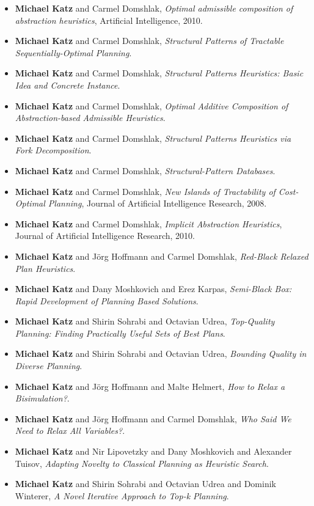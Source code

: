 \begin{itemize}[noitemsep]
\item {\bf Michael Katz} and Carmel Domshlak, {\it Optimal admissible composition of abstraction heuristics}, Artificial Intelligence, 2010.
\item {\bf Michael Katz} and Carmel Domshlak, {\it Structural Patterns of Tractable Sequentially-Optimal Planning}.
\item {\bf Michael Katz} and Carmel Domshlak, {\it Structural Patterns Heuristics: Basic Idea and Concrete Instance}.
\item {\bf Michael Katz} and Carmel Domshlak, {\it Optimal Additive Composition of Abstraction-based Admissible Heuristics}.
\item {\bf Michael Katz} and Carmel Domshlak, {\it Structural Patterns Heuristics via Fork Decomposition}.
\item {\bf Michael Katz} and Carmel Domshlak, {\it Structural-Pattern Databases}.
\item {\bf Michael Katz} and Carmel Domshlak, {\it New Islands of Tractability of Cost-Optimal Planning}, Journal of Artificial Intelligence Research, 2008.
\item {\bf Michael Katz} and Carmel Domshlak, {\it Implicit Abstraction Heuristics}, Journal of Artificial Intelligence Research, 2010.
\item {\bf Michael Katz} and Jörg Hoffmann and Carmel Domshlak, {\it Red-Black Relaxed Plan Heuristics}.
\item {\bf Michael Katz} and Dany Moshkovich and Erez Karpas, {\it Semi-Black Box: Rapid Development of Planning Based Solutions}.
\item {\bf Michael Katz} and Shirin Sohrabi and Octavian Udrea, {\it Top-Quality Planning: Finding Practically Useful Sets of Best Plans}.
\item {\bf Michael Katz} and Shirin Sohrabi and Octavian Udrea, {\it Bounding Quality in Diverse Planning}.
\item {\bf Michael Katz} and Jörg Hoffmann and Malte Helmert, {\it How to Relax a Bisimulation?}.
\item {\bf Michael Katz} and Jörg Hoffmann and Carmel Domshlak, {\it Who Said We Need to Relax \em All Variables?}.
\item {\bf Michael Katz} and Nir Lipovetzky and Dany Moshkovich and Alexander Tuisov, {\it Adapting Novelty to Classical Planning as Heuristic Search}.
\item {\bf Michael Katz} and Shirin Sohrabi and Octavian Udrea and Dominik Winterer, {\it A Novel Iterative Approach to Top-k Planning}.

\end{itemize}
